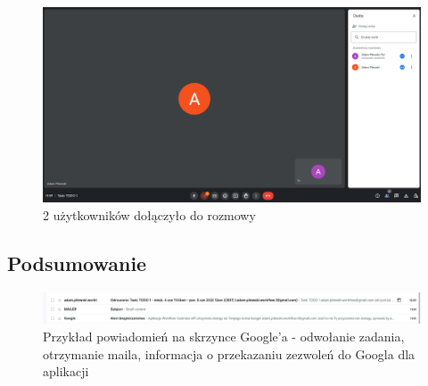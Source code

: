 \documentclass[a4paper, 12pt]{article}
\begin{document}
\begin{figure}[H]
	\centering
    \includegraphics*[scale=0.2]{img/google-meet-2.png}
    \caption{2 użytkowników dołączyło do rozmowy}
\end{figure}


\subsection{Podsumowanie}
\begin{figure}[H]
	\centering
    \includegraphics*[scale=0.4]{img/google-msgs.png}
	\caption{Przykład powiadomień na skrzynce Google'a - odwołanie zadania, otrzymanie maila, informacja o przekazaniu zezwoleń do Googla dla aplikacji}
\end{figure}
\end{document}
